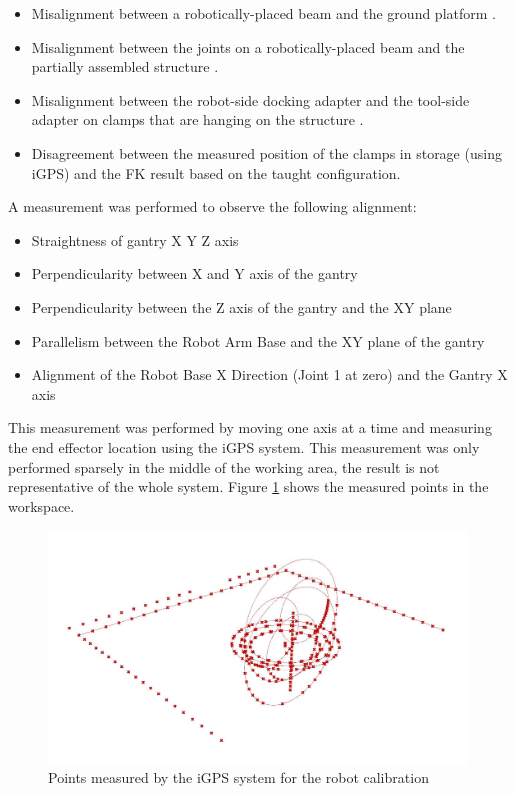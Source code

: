 \begin{itemize}
	\item Misalignment between a robotically-placed beam and the ground platform .

	\item Misalignment between the joints on a robotically-placed beam and the partially assembled structure .

	\item Misalignment between the robot-side docking adapter and the tool-side adapter on clamps that are hanging on the structure .

	\item Disagreement between the measured position of the clamps in storage (using iGPS) and the FK result based on the taught configuration.

\end{itemize}
A measurement was performed to observe the following alignment:

\begin{itemize}
	\item Straightness of gantry X Y Z axis
	\item Perpendicularity between X and Y axis of the gantry
	\item Perpendicularity between the Z axis of the gantry and the XY plane
	\item Parallelism between the Robot Arm Base and the XY plane of the gantry
	\item Alignment of the Robot Base X Direction (Joint 1 at zero) and the Gantry X axis
\end{itemize}

This measurement was performed by moving one axis at a time and measuring the end effector location using the iGPS system. This measurement was only performed sparsely in the middle of the working area, the result is not representative of the whole system. Figure \ref{fig:points-measured-by-the-igps} shows the measured points in the workspace.

\begin{figure}[!h]
    \centering
    \includegraphics[width=0.99\textwidth]{images/6b/img21.jpg}
    \caption{Points measured by the iGPS system for the robot calibration}
    \label{fig:points-measured-by-the-igps}
\end{figure}

